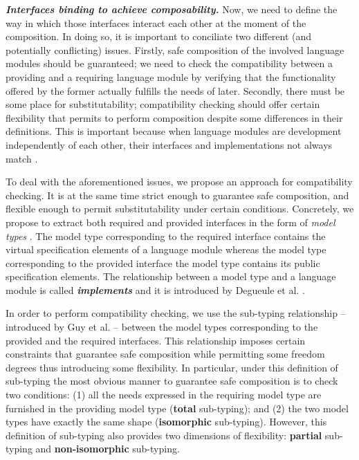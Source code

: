 \vspace{2mm}
\textbf{\textit{Interfaces binding to achieve composability.}} Now, we need to define the way in which those interfaces interact each other at the moment of the composition. In doing so, it is important to conciliate two different (and potentially conflicting) issues. Firstly, safe composition of the involved language modules should be guaranteed; we need to check the compatibility between a providing and a requiring language module by verifying that the functionality offered by the former actually fulfills the needs of later. Secondly, there must be some place for substitutability; compatibility checking should offer certain flexibility that permits to perform composition despite some differences in their definitions. This is important because when language modules are development independently of each other, their interfaces and implementations not always match \cite{Gschwind:2012}.

To deal with the aforementioned issues, we propose an approach for compatibility checking. It is at the same time strict enough to guarantee safe composition, and flexible enough to permit substitutability under certain conditions. Concretely, we propose to extract both required and provided interfaces in the form of \textit{model types} \cite{Steel:2007}. The model type corresponding to the required interface contains the virtual specification elements of a language module whereas the model type corresponding to the provided interface the model type contains its public specification elements. The relationship between a model type and a language module is called \textsl{\textbf{implements}} and it is introduced by Degueule et al. \cite{Degueule:2015a}. 

In order to perform compatibility checking, we use the sub-typing relationship --introduced by Guy et al. \cite{Guy:2012}-- between the model types corresponding to the provided and the required interfaces. This relationship imposes certain constraints that guarantee safe composition while permitting some freedom degrees thus introducing some flexibility. In particular, under this definition of sub-typing the most obvious manner to guarantee safe composition is to check two conditions: (1) all the needs expressed in the requiring model type are furnished in the providing model type (\textbf{total} sub-typing); and (2) the two model types have exactly the same shape (\textbf{isomorphic} sub-typing). However, this definition of sub-typing also provides two dimensions of flexibility: \textbf{partial} sub-typing and \textbf{non-isomorphic} sub-typing. 


